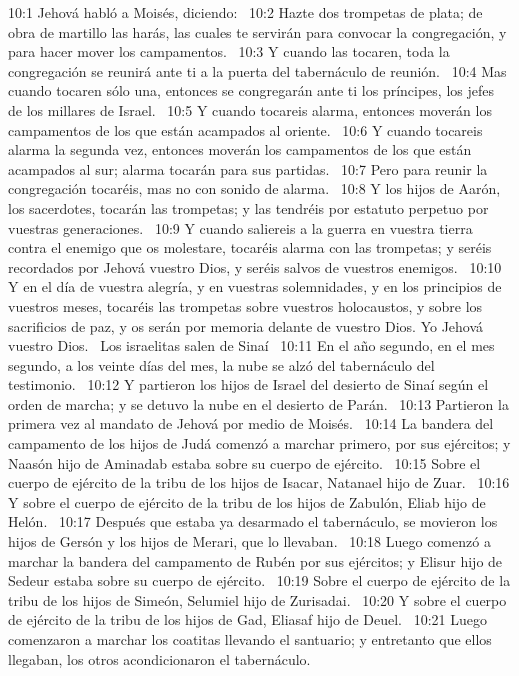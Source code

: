 10:1 Jehová habló a Moisés, diciendo:  
10:2 Hazte dos trompetas de plata; de obra de martillo las harás, las cuales te servirán para convocar la congregación, y para hacer mover los campamentos.  
10:3 Y cuando las tocaren, toda la congregación se reunirá ante ti a la puerta del tabernáculo de reunión.  
10:4 Mas cuando tocaren sólo una, entonces se congregarán ante ti los príncipes, los jefes de los millares de Israel.  
10:5 Y cuando tocareis alarma, entonces moverán los campamentos de los que están acampados al oriente.  
10:6 Y cuando tocareis alarma la segunda vez, entonces moverán los campamentos de los que están acampados al sur; alarma tocarán para sus partidas.  
10:7 Pero para reunir la congregación tocaréis, mas no con sonido de alarma.  
10:8 Y los hijos de Aarón, los sacerdotes, tocarán las trompetas; y las tendréis por estatuto perpetuo por vuestras generaciones.  
10:9 Y cuando saliereis a la guerra en vuestra tierra contra el enemigo que os molestare, tocaréis alarma con las trompetas; y seréis recordados por Jehová vuestro Dios, y seréis salvos de vuestros enemigos.  
10:10 Y en el día de vuestra alegría, y en vuestras solemnidades, y en los principios de vuestros meses, tocaréis las trompetas sobre vuestros holocaustos, y sobre los sacrificios de paz, y os serán por memoria delante de vuestro Dios. Yo Jehová vuestro Dios.  
Los israelitas salen de Sinaí  
10:11 En el año segundo, en el mes segundo, a los veinte días del mes, la nube se alzó del tabernáculo del testimonio.  
10:12 Y partieron los hijos de Israel del desierto de Sinaí según el orden de marcha; y se detuvo la nube en el desierto de Parán.  
10:13 Partieron la primera vez al mandato de Jehová por medio de Moisés.  
10:14 La bandera del campamento de los hijos de Judá comenzó a marchar primero, por sus ejércitos; y Naasón hijo de Aminadab estaba sobre su cuerpo de ejército.  
10:15 Sobre el cuerpo de ejército de la tribu de los hijos de Isacar, Natanael hijo de Zuar.  
10:16 Y sobre el cuerpo de ejército de la tribu de los hijos de Zabulón, Eliab hijo de Helón.  
10:17 Después que estaba ya desarmado el tabernáculo, se movieron los hijos de Gersón y los hijos de Merari, que lo llevaban.  
10:18 Luego comenzó a marchar la bandera del campamento de Rubén por sus ejércitos; y Elisur hijo de Sedeur estaba sobre su cuerpo de ejército.  
10:19 Sobre el cuerpo de ejército de la tribu de los hijos de Simeón, Selumiel hijo de Zurisadai.  
10:20 Y sobre el cuerpo de ejército de la tribu de los hijos de Gad, Eliasaf hijo de Deuel.  
10:21 Luego comenzaron a marchar los coatitas llevando el santuario; y entretanto que ellos llegaban, los otros acondicionaron el tabernáculo.  
